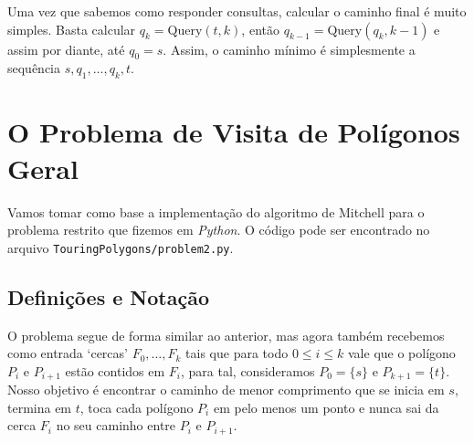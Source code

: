\documentclass{article}
\begin{document}
Uma vez que sabemos como responder consultas, calcular o caminho final é muito simples. Basta calcular \(q_k = \text{Query}(t, k)\), então \(q_{k - 1} =\text{Query}(q_k, k - 1)\) e assim por diante, até \(q_0 = s\). Assim, o caminho mínimo é simplesmente a sequência \(s, q_1, \ldots, q_k, t\).

\section{O Problema de Visita de Polígonos Geral}

Vamos tomar como base a implementação do algoritmo de Mitchell para o problema restrito que fizemos em \textit{Python}. O código pode ser encontrado no arquivo \texttt{TouringPolygons/problem2.py}.

\subsection{Definições e Notação}

O problema segue de forma similar ao anterior, mas agora também recebemos como entrada `cercas' \(F_0, \dots, F_k\) tais que para todo \(0 \le i \le k\) vale que o polígono \(P_i\) e \(P_{i + 1}\) estão contidos em \(F_i\), para tal, consideramos \(P_0 = \{s\}\) e \(P_{k + 1} = \{t\}\). Nosso objetivo é encontrar o caminho de menor comprimento que se inicia em \(s\), termina em \(t\), toca cada polígono \(P_i\) em pelo menos um ponto e nunca sai da cerca \(F_i\) no seu caminho entre \(P_i\) e \(P_{i + 1}\).


\end{document}
